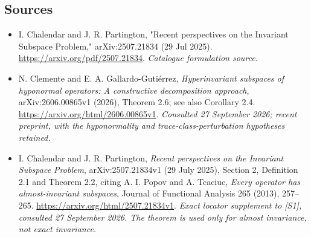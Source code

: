 \documentclass[11pt,a4paper]{article}
\numberwithin{equation}{section}
\begin{document}
\subsection{Sources}
\begin{itemize}\raggedright
\item[\textnormal{[S1]}]\hypertarget{source:statement:1}{} I. Chalendar and J. R. Partington, "Recent perspectives on the Invariant Subspace Problem," arXiv:2507.21834 (29 Jul 2025).
\url{https://arxiv.org/pdf/2507.21834}.
{\small\textit{Catalogue formulation source.}}
\item[\textnormal{[E1]}]\hypertarget{extra:statement:1}{} N. Clemente and
E. A. Gallardo-Guti\'errez, \emph{Hyperinvariant subspaces of hyponormal
operators: A constructive decomposition approach}, arXiv:2606.00865v1
(2026), Theorem 2.6; see also Corollary 2.4.
\url{https://arxiv.org/html/2606.00865v1}.
{\small\textit{Consulted 27 September 2026; recent preprint, with the hyponormality and trace-class-perturbation hypotheses retained.}}
\item[\textnormal{[E2]}]\hypertarget{extra:statement:2}{} I. Chalendar and
J. R. Partington, \emph{Recent perspectives on the Invariant Subspace
Problem}, arXiv:2507.21834v1 (29 July 2025), Section 2,
Definition 2.1 and Theorem 2.2, citing A. I. Popov and A. Tcaciuc,
\emph{Every operator has almost-invariant subspaces},
Journal of Functional Analysis 265 (2013), 257--265.
\url{https://arxiv.org/html/2507.21834v1}.
{\small\textit{Exact locator supplement to [S1], consulted 27 September 2026. The theorem is used only for almost invariance, not exact invariance.}}
\end{itemize}
\end{document}
